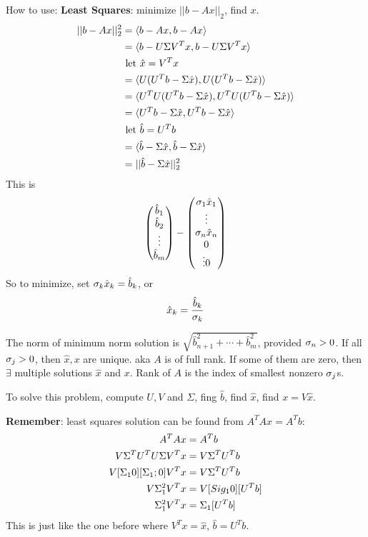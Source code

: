 How to use:
\textbf{Least Squares}: minimize $||b-Ax||_2$, find $x$. 
  \begin{align*}
    ||b-Ax||_2^2 &= \langle b-Ax, b-Ax \rangle \\
&= \langle b-U\Sigma V^Tx, b-U\Sigma V^Tx \rangle \\
&\text{ let $\hat x = V^Tx$}\\
&= \langle U(U^Tb-\Sigma\hat x), U(U^Tb-\Sigma\hat x) \rangle \\
&= \langle U^TU(U^Tb-\Sigma\hat x), U^TU(U^Tb-\Sigma\hat x) \rangle \\
&= \langle U^Tb-\Sigma\hat x, U^Tb-\Sigma\hat x \rangle \\
&\text{ let $\hat b = U^Tb$}\\
&= \langle \hat b-\Sigma\hat x,  \hat b-\Sigma\hat x \rangle \\
&= || \hat b - \Sigma \hat x ||^2_2
  \end{align*}
This is $$
\begin{pmatrix}
 \hat b_1 \\ \hat b_2 \\ \vdots \\ \hat b_m
\end{pmatrix}
-
\begin{pmatrix}
 \sigma_1 \hat x_1 \\ \vdots \\ \sigma_n\hat x_n \\ 0 \\ \vdots 0
\end{pmatrix}
$$
So to minimize, set $\sigma_k\hat x_k = \hat b_k$, or $$\hat x_k =
\frac{\hat b_k}{\sigma_k}$$

The norm of minimum norm solution is $\sqrt{\hat b^2_{n+1} + \cdots +
  \hat b_m^2}$, provided $\sigma_n > 0$. If all $\sigma_j > 0$, then $\hat
x, x$ are unique. aka $A$ is of full rank. If some of them are zero,
then $\exists$ multiple solutions $\hat x$ and $x$. Rank of $A$ is the
index of smallest nonzero $\sigma_j$s.

To solve this problem, compute $U, V$ and $\Sigma$, fing $\hat b$,
find $\hat x$, find $x=V\hat x$.

\textbf{Remember}: least squares solution can be found from $A^TAx =
A^Tb$:
\begin{align*}
  A^TAx &=A^Tb\\
V\Sigma^TU^T U\Sigma V^T x &= V \Sigma^T U^Tb\\
V[\Sigma_1 0][\Sigma_1; 0]V^T x&= V \Sigma^T U^Tb\\
V\Sigma_1^2 V^T x &= V[Sig_1 0][U^Tb]\\
\Sigma_1^2 V^Tx &=\Sigma_1[U^Tb]\\
\end{align*}
This is just like the one before where $V^Tx = \hat x$,
$\hat b = U^Tb$.

